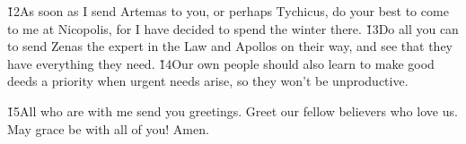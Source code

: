 \v{12}As soon as I send Artemas to you, or perhaps Tychicus, do your best to come to me at Nicopolis, for I have decided to spend the winter there. \v{13}Do all you can to send Zenas the expert in the Law and Apollos on their way, and see that they have everything they need. \v{14}Our own people should also learn to make good deeds a priority when urgent needs arise, so they won't be unproductive.

\v{15}All who are with me send you greetings. Greet our fellow believers who love us. May grace be with all of you! Amen.

